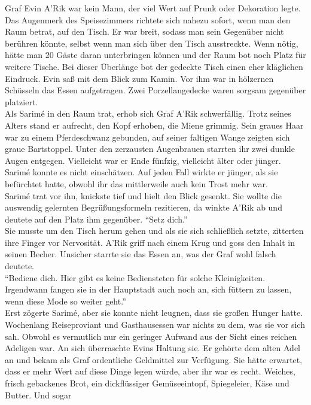 Graf Evin A'Rik war kein Mann, der viel Wert auf Prunk oder Dekoration legte. Das Augenmerk des 
Speisezimmers richtete sich nahezu sofort, wenn man den Raum betrat, auf den Tisch. Er war breit, 
sodass man sein Gegenüber nicht berühren könnte, selbst wenn man sich über den Tisch ausstreckte. 
Wenn nötig, hätte man 20 Gäste daran unterbringen können und der Raum bot noch Platz für weitere 
Tische. Bei dieser Überlänge bot der gedeckte Tisch einen eher kläglichen Eindruck. Evin saß mit dem 
Blick zum Kamin. Vor ihm war in hölzernen Schüsseln das Essen aufgetragen. Zwei Porzellangedecke 
waren sorgsam gegenüber platziert.\\
Als Sarimé in den Raum trat, erhob sich Graf A'Rik schwerfällig. Trotz seines Alters stand er 
aufrecht, den Kopf erhoben, die Miene grimmig. Sein graues Haar war zu einem Pferdeschwanz 
gebunden, auf seiner faltigen Wange zeigten sich graue Bartstoppel. Unter den zerzausten 
Augenbrauen starrten ihr zwei dunkle Augen entgegen. Vielleicht war er Ende fünfzig, vielleicht 
älter oder jünger. Sarimé konnte es nicht einschätzen. Auf jeden Fall wirkte er jünger, als sie 
befürchtet hatte, obwohl ihr das mittlerweile auch kein Trost mehr war.\\
Sarimé trat vor ihn, knickste tief und hielt den Blick gesenkt. Sie wollte die auswendig gelernten 
Begrüßungsformeln rezitieren, da winkte A'Rik ab und deutete auf den Platz ihm gegenüber. ``Setz 
dich.''\\
Sie musste um den Tisch herum gehen und als sie sich schließlich setzte, zitterten ihre Finger vor 
Nervosität. A'Rik griff nach einem Krug und goss den Inhalt in seinen Becher. Unsicher starrte sie 
das Essen an, was der Graf wohl falsch deutete.\\
``Bediene dich. Hier gibt es keine Bediensteten für solche Kleinigkeiten. Irgendwann fangen sie in 
der Hauptstadt auch noch an, sich füttern zu lassen, wenn diese Mode so weiter geht.''\\
Erst zögerte Sarimé, aber sie konnte nicht leugnen, dass sie großen Hunger hatte. Wochenlang 
Reiseproviant und Gasthausessen war nichts zu dem, was sie vor sich sah. Obwohl es vermutlich nur 
ein geringer Aufwand aus der Sicht eines reichen Adeligen war. An sich überraschte Evins Haltung 
sie. Er gehörte dem alten Adel an und bekam als Graf ordentliche Geldmittel zur Verfügung. Sie 
hätte erwartet, dass er mehr Wert auf diese Dinge legen würde, aber ihr war es recht. Weiches, 
frisch gebackenes Brot, ein dickflüssiger Gemüseeintopf, Spiegeleier, Käse und Butter. Und sogar 
